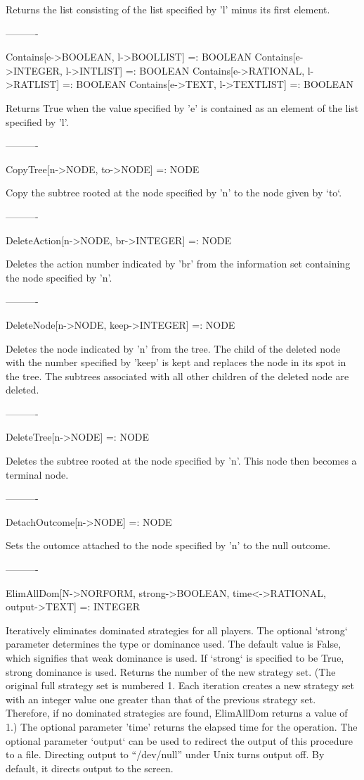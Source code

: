 	Returns the list consisting of the list specified by 'l' minus its 
first element.

----------

Contains[e->BOOLEAN, l->BOOLLIST] =: BOOLEAN
Contains[e->INTEGER, l->INTLIST] =: BOOLEAN
Contains[e->RATIONAL, l->RATLIST] =: BOOLEAN
Contains[e->TEXT, l->TEXTLIST] =: BOOLEAN

	Returns True when the value specified by 'e' is contained as an element
of the list specified by 'l'.

----------

CopyTree[n->NODE, to->NODE] =: NODE

	Copy the subtree rooted at the node specified by 'n' to the node given
by `to`.

----------

DeleteAction[n->NODE, br->INTEGER] =: NODE

	Deletes the action number indicated by 'br' from the information set
containing the node specified by 'n'.

----------

DeleteNode[n->NODE, keep->INTEGER] =: NODE

	Deletes the node indicated by 'n' from the tree.  The child of the 
deleted node with the number specified by 'keep' is kept and replaces the node
in its spot in the tree.  The subtrees associated with all other children of 
the deleted node are deleted.

----------

DeleteTree[n->NODE] =: NODE

	Deletes the subtree rooted at the node specified by 'n'.  This node 
then becomes a terminal node.

----------

DetachOutcome[n->NODE] =: NODE

	Sets the outomce attached to the node specified by 'n' to the null
outcome.

----------

ElimAllDom[N->NORFORM, {strong->BOOLEAN}, {time<->RATIONAL}, {output->TEXT}] 
	=: INTEGER

	Iteratively eliminates dominated strategies for all players.  The 
optional `strong` parameter determines the type or dominance used.  The
default value is False, which signifies that weak dominance is used.  If 
`strong` is specified to be True, strong dominance is used.  Returns the
number of the new strategy set.  (The original full strategy set is 
numbered 1.  Each iteration creates a new strategy set with an integer value
one greater than that of the previous strategy set.  Therefore, if no
dominated strategies are found, ElimAllDom returns a value of 1.)  The
optional parameter 'time' returns the elapsed time for the operation.  The 
optional parameter `output` can be used to redirect the output of this 
procedure to a file.  Directing output to ``/dev/null'' under Unix turns output
off.  By default, it directs output to the screen.

